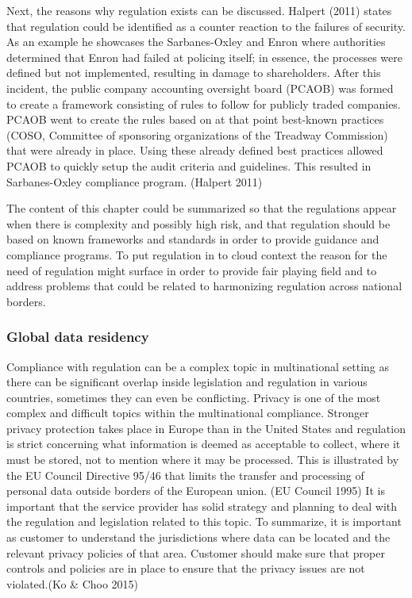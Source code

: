 \documentclass{article}
\begin{document}
\par
Next, the reasons why regulation exists can be discussed. Halpert (2011) states that regulation could be identified as a counter reaction to the failures of security. As an example he showcases the Sarbanes-Oxley and Enron where authorities determined that Enron had failed at policing itself; in essence, the processes were defined but not implemented, resulting in damage to shareholders. After this incident, the public company accounting oversight board (PCAOB) was formed to create a framework consisting of rules to follow for publicly traded companies.
PCAOB went to create the rules based on at that point best-known practices (COSO, Committee of sponsoring organizations of the Treadway Commission) that were already in place. Using these already defined best practices allowed PCAOB to quickly setup the audit criteria and guidelines. This resulted in Sarbanes-Oxley compliance program. (Halpert 2011)
\par
The content of this chapter could be summarized so that the regulations appear when there is complexity and possibly high risk, and that regulation should be based on known frameworks and standards in order to provide guidance and compliance programs.
To put regulation in to cloud context the reason for the need of regulation might surface in order to provide fair playing field and to address problems that could be related to harmonizing regulation across national borders.
\subsubsection{Global data residency}
Compliance with regulation can be a complex topic in multinational setting as there can be significant overlap inside legislation and regulation in various countries, sometimes they can even be conflicting. Privacy is one of the most complex and difficult topics within the multinational compliance. Stronger privacy protection takes place in Europe than in the United States and regulation is strict concerning what information is deemed as acceptable to collect, where it must be stored, not to mention where it may be processed. This is illustrated by the EU Council Directive 95/46 that limits the transfer and processing of personal data outside borders of the European union. (EU Council 1995) It is important that the service provider has solid strategy and planning to deal with the regulation and legislation related to this topic. To summarize, it is important as customer to understand the jurisdictions where data can be located and the relevant privacy policies of that area. Customer should make sure that proper controls and policies are in place to ensure that the privacy issues are not violated.(Ko \& Choo 2015)
\end{document}
